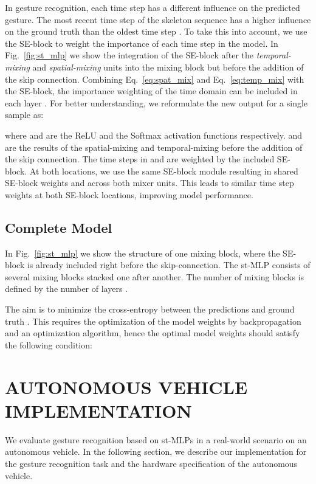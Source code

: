 \documentclass[letterpaper, 10 pt, conference]{ieeeconf}
\begin{document}
In gesture recognition, each time step has a different influence on the predicted gesture. The most recent time step  of the skeleton sequence  has a higher influence on the ground truth  than the oldest time step . To take this into account, we use the SE-block to weight the importance of each time step in the model. In Fig.~\ref{fig:st_mlp} we show the integration of the SE-block after the \textit{temporal-mixing} and \textit{spatial-mixing} units into the mixing block but before the addition of the skip connection. Combining Eq.~\ref{eq:spat_mix} and Eq.~\ref{eq:temp_mix} with the SE-block, the importance weighting of the time domain can be included in each layer . For better understanding, we reformulate the new output for a single sample as:



where  and  are the ReLU and the Softmax activation functions respectively.  and  are the results of the spatial-mixing and temporal-mixing before the addition of the skip connection. The time steps in  and  are weighted by the included SE-block. At both locations, we use the same SE-block module resulting in shared SE-block weights  and  across both mixer units. This leads to similar time step weights at both SE-block locations, improving model performance.


\subsection{Complete Model}

In Fig.~\ref{fig:st_mlp} we show the structure of one mixing block, where the SE-block is already included right before the skip-connection. The st-MLP consists of several mixing blocks stacked one after another. The number of mixing blocks is defined by the number of layers .

The aim is to minimize the cross-entropy between the predictions  and ground truth . This requires the optimization of the model weights by backpropagation and an optimization algorithm, hence the optimal model weights  should satisfy the following condition:




\section{AUTONOMOUS VEHICLE IMPLEMENTATION}
\label{sec:_auton_car_impl}

We evaluate gesture recognition based on st-MLPs in a real-world scenario on an autonomous vehicle. In the following section, we describe our implementation for the gesture recognition task and the hardware specification of the autonomous vehicle.
\end{document}
